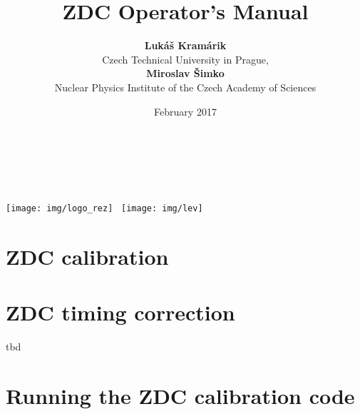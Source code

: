 \documentclass[a4paper,10pt]{report}
\title{ZDC Operator's Manual}
\author{\textbf{Lukáš Kramárik}\\
Czech Technical University in Prague,\\[.5cm] 
\textbf{Miroslav Šimko}\\[.4cm]
Nuclear Physics Institute of the Czech Academy of Sciences}
\date{February 2017}
\begin{document}
\makeatletter
\begin{titlepage}
\begin{center}
{\huge \bfseries  \@title }\\[2cm]
{\LARGE  \@author}\\[4ex] 
{\large \@date}\\[50ex]
\texttt{[image: img/logo\_rez]}\hspace*{3cm}~%
\texttt{[image: img/lev]}
\end{center}
\end{titlepage}
\makeatother
\thispagestyle{empty}
\newpage


\tableofcontents


\chapter{ZDC calibration\label{calibration}}


\chapter{ZDC timing correction}
tbd

\chapter{Running the ZDC calibration code\label{code}}




\end{document}
